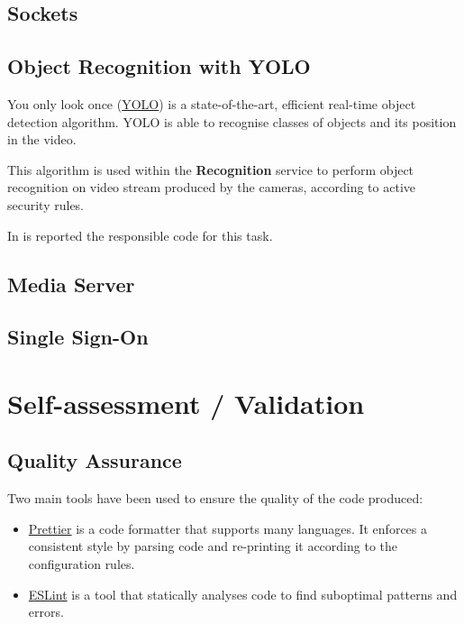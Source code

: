 \documentclass{scrartcl}
\begin{document}
    \subsection{Sockets}


    \subsection{Object Recognition with YOLO}
    You only look once (\href{https://pjreddie.com/darknet/yolo}{YOLO}) is a state-of-the-art, efficient real-time object detection algorithm.
    YOLO is able to recognise classes of objects and its position in the video.

    This algorithm is used within the \textbf{Recognition} service to perform object recognition on video stream produced by the cameras, according to active security rules.

    In  is reported the responsible code for this task.
    


    \subsection{Media Server}

    \subsection{Single Sign-On}

    \section{Self-assessment / Validation}

    \subsection{Quality Assurance}\label{subsec:quality-assurance}

    Two main tools have been used to ensure the quality of the code produced:

    \begin{itemize}
        \item \href{https://prettier.io/}{Prettier} is a code formatter that supports many languages.
        It enforces a consistent style by parsing code and re-printing it according to the configuration rules.
        \item \href{https://eslint.org/}{ESLint} is a tool that statically analyses code to find suboptimal patterns and errors.
    \end{itemize}
\end{document}
